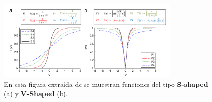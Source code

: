 \begin{figure}[htp]
  \begin{center}
    \includegraphics[width=0.8\textwidth]{imagenes/transfer_functions.png}
  \end{center}
  \caption[Funciones de transferencia]{En esta figura extraída de \cite{mirjalili_s-shaped_2013} se muestran funciones del tipo \textbf{S-shaped} (a) y \textbf{V-Shaped} (b).}
\end{figure}